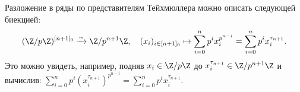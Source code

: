 \documentclass[
	extrafontsizes,
	11pt,
	hyphens,
]{memoir}
\begin{document}

\begin{observation}
Разложение в ряды по представителям Тейхмюллера можно описать следующей биекцией:
\begin{equation}
(\Z/p\Z)^{[n+1]_0}
\xrightarrow{\sim}
\Z/p^{n+1}\Z, \quad
(x_i)_{i \in [n+1]_0}
\mapsto
\sum_{i=0}^n p^i x_i^{p^{n-i}}
=
\sum_{i=0}^n p^i x_i^{\tau_{n+1}}.
\label{eq:ghost}
\end{equation}
Это можно увидеть, например,
подняв \(x_i \in \Z/p\Z\) до \(x_i^{\tau_{n+1}} \in \Z/p^{n+1}\Z\) и вычислив:
\(
\sum_{i=0}^n p^i (x_i^{\tau_{n+1}})^{p^{n-i}} =
\sum_{i=0}^n p^i x_i^{\tau_{n+1}}
\).
\end{observation}
\end{document}
